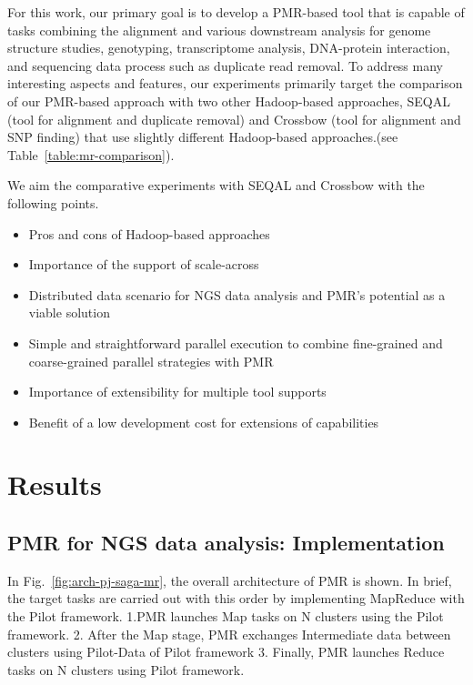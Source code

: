 \documentclass{sig-alternate}
\begin{document}
For this work, our primary goal is to develop a PMR-based tool that is capable of tasks combining the alignment and various downstream analysis for genome structure studies, genotyping, transcriptome analysis, DNA-protein interaction, and sequencing data process such as duplicate read removal.  To address many interesting aspects and features, our experiments primarily target the comparison of our PMR-based approach with two other Hadoop-based approaches, SEQAL (tool for alignment and duplicate removal) and Crossbow (tool for alignment and SNP finding) that use slightly different Hadoop-based approaches.(see Table~\ref{table:mr-comparison}).  

We aim the comparative experiments with SEQAL and Crossbow with the following points.
\begin{itemize}
\item Pros and cons of Hadoop-based approaches
\item Importance of the support of scale-across 
\item Distributed data scenario for NGS data analysis and PMR's potential as a viable solution
\item Simple and straightforward parallel execution to combine fine-grained and coarse-grained parallel strategies with PMR 
\item Importance of extensibility for multiple tool supports
\item Benefit of a low development cost for extensions of capabilities 
\end{itemize}





\section{Results}\label{sec:results}

\subsection{PMR for NGS data analysis: Implementation}
In Fig.~\ref{fig:arch-pj-saga-mr}, the overall architecture of PMR is shown.  In brief, the target tasks are carried out with this order by implementing MapReduce with the Pilot framework\cite{pmr2012}. 1.PMR launches Map tasks on N clusters using the Pilot framework. 2. After the Map stage, PMR exchanges Intermediate data between clusters using Pilot-Data of Pilot framework  3. Finally, PMR launches Reduce tasks on N clusters using Pilot framework.
\end{document}
